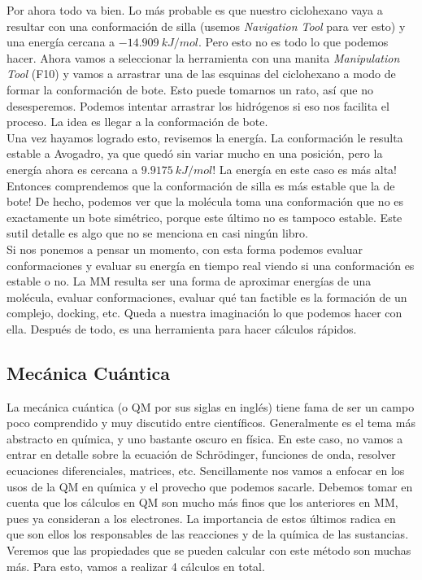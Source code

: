 \documentclass[10pt,letterpaper]{article}
\begin{document}
Por ahora todo va bien. Lo m\'as probable es que nuestro ciclohexano vaya a resultar con una conformaci\'on de silla (usemos \emph{Navigation Tool} para ver esto) y una energ\'ia cercana a $-14.909\ kJ/mol$. Pero esto no es todo lo que podemos hacer. Ahora vamos a seleccionar la herramienta con una manita \emph{Manipulation Tool} (F10) y vamos a arrastrar una de las esquinas del ciclohexano a modo de formar la conformaci\'on de bote. Esto puede tomarnos un rato, as\'i que no desesperemos. Podemos intentar arrastrar los hidr\'ogenos si eso nos facilita el proceso. La idea es llegar a la conformaci\'on de bote.\\

Una vez hayamos logrado esto, revisemos la energ\'ia. La conformaci\'on le resulta estable a Avogadro, ya que qued\'o sin variar mucho en una posici\'on, pero la energ\'ia ahora es cercana a $9.9175\ kJ/mol$! La energ\'ia en este caso es m\'as alta! Entonces comprendemos que la conformaci\'on de silla es m\'as estable que la de bote! De hecho, podemos ver que la mol\'ecula toma una conformaci\'on que no es exactamente un bote sim\'etrico, porque este \'ultimo no es tampoco estable. Este sutil detalle es algo que no se menciona en casi ning\'un libro.\\

Si nos ponemos a pensar un momento, con esta forma podemos evaluar conformaciones y evaluar su energ\'ia en tiempo real viendo si una conformaci\'on es estable o no. La MM resulta ser una forma de aproximar energ\'ias de una mol\'ecula, evaluar conformaciones, evaluar qu\'e tan factible es la formaci\'on de un complejo, docking, etc. Queda a nuestra imaginaci\'on lo que podemos hacer con ella. Despu\'es de todo, es una herramienta para hacer c\'alculos r\'apidos.

\subsection{Mec\'anica Cu\'antica}
La mec\'anica cu\'antica (o QM por sus siglas en ingl\'es) tiene fama de ser un campo poco comprendido y muy discutido entre cient\'ificos. Generalmente es el tema m\'as abstracto en qu\'imica, y uno bastante oscuro en f\'isica. En este caso, no vamos a entrar en detalle sobre la ecuaci\'on de Schr\"odinger, funciones de onda, resolver ecuaciones diferenciales, matrices, etc. Sencillamente nos vamos a enfocar en los usos de la QM en qu\'imica y el provecho que podemos sacarle. Debemos tomar en cuenta que los c\'alculos en QM son mucho m\'as finos que los anteriores en MM, pues ya consideran a los electrones. La importancia de estos \'ultimos radica en que son ellos los responsables de las reacciones y de la qu\'imica de las sustancias. Veremos que las propiedades que se pueden calcular con este m\'etodo son muchas m\'as. Para esto, vamos a realizar 4 c\'alculos en total.\\
\end{document}
